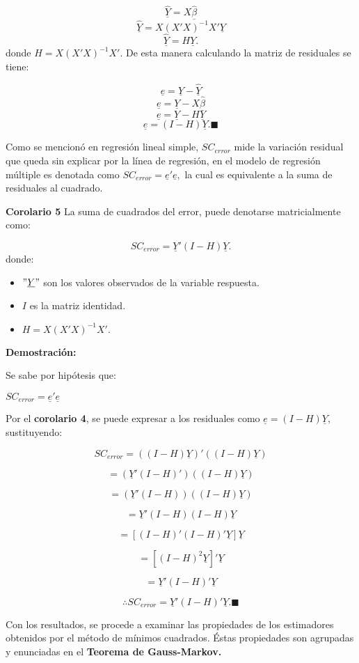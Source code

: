 \documentclass[
  a4paper,
  oneside,
  openany]{book}
\begin{document}
\[\underline{\hat{Y}}=X\underline{\hat{\beta}}\]
\[\underline{\hat{Y}}=X(X'X)^{-1}X'\underline{Y}\]
\[\underline{\hat{Y}}=H\underline{Y}.\]
donde \(H=X(X'X)^{-1}X'.\) De esta manera calculando la matriz de residuales se tiene:

\[\underline{e}=\underline{Y}-\underline{\hat{Y}}\]
\[\underline{e}=\underline{Y}-X\underline{\hat{\beta}}\]
\[\underline{e}=\underline{Y}-H\underline{Y}\]
\[\underline{e}=(I-H)\underline{Y}.\blacksquare\]

Como se mencionó en regresión lineal simple, \(SC_{error}\) mide la variación residual que queda sin explicar por la línea de regresión, en el modelo de regresión múltiple es denotada como \(SC_{error}=\underline{e}'\underline{e},\) la cual es equivalente a la suma de residuales al cuadrado.

\textbf{Corolario 5} La suma de cuadrados del error, puede denotarse matricialmente como:

\[SC_{error}=\underline{Y}'(I-H)\underline{Y}.\]
donde:

\begin{itemize}
\item
  \("\underline{Y}"\) son los valores observados de la variable respuesta.
\item
  \(I\) es la matriz identidad.
\item
  \(H=X(X'X)^{-1}X'.\)
\end{itemize}

\textbf{Demostración:}

Se sabe por hipótesis que:

\(SC_{error}=\underline{e}'\underline{e}\)

Por el \textbf{corolario 4}, se puede expresar a los residuales como \(\underline{e}=(I-H)\underline{Y},\) sustituyendo:

\[SC_{error}=((I-H)\underline{Y})'((I-H)\underline{Y})\]

\[=(\underline{Y}'(I-H)')((I-H)\underline{Y})\]

\[=(\underline{Y}'(I-H))((I-H)\underline{Y})\]

\[=\underline{Y}'(I-H)(I-H)\underline{Y}\]

\[=[(I-H)'(I-H)'\underline{Y}]\underline{Y}\]

\[=[(I-H)^2\underline{Y}]'\underline{Y}\]

\[=\underline{Y}'(I-H)'\underline{Y}\]

\[\therefore SC_{error}=\underline{Y}'(I-H)'\underline{Y}. \blacksquare\]

Con los resultados, se procede a examinar las propiedades de los estimadores obtenidos por el método de mínimos cuadrados.
Éstas propiedades son agrupadas y enunciadas en el \textbf{Teorema de Gauss-Markov.}
\end{document}
